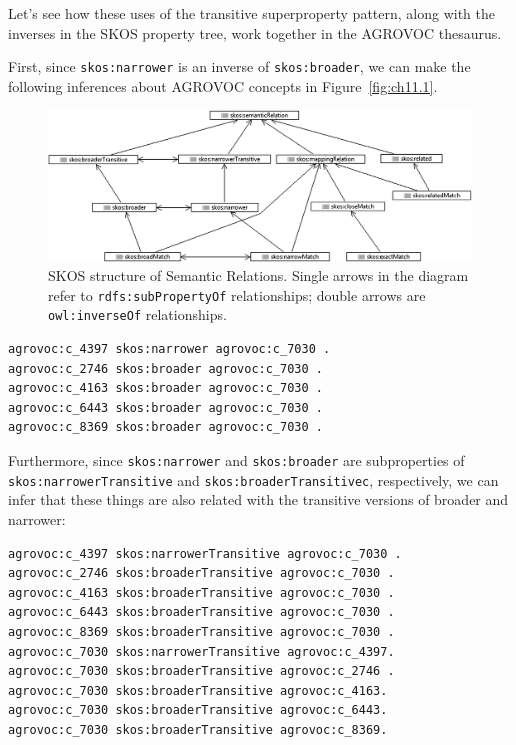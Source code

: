 Let's see how these uses of the transitive superproperty pattern, along
with the inverses in the
SKOS property tree, work together in the AGROVOC thesaurus.

First, since \texttt{skos:narrower} is an inverse of \texttt{skos:broader}, we can make
the following inferences about AGROVOC concepts in Figure~\ref{fig:ch11.1}.

\begin{figure}
\centering
\includegraphics[width=5in]{media/ch11/f11-02.png}
\caption{SKOS structure of Semantic Relations. Single arrows in the diagram refer to \texttt{rdfs:subPropertyOf} relationships; double arrows are \texttt{owl:inverseOf} relationships.}
\label{fig:ch11.2}
\end{figure}





\begin{lstlisting}
agrovoc:c_4397 skos:narrower agrovoc:c_7030 .
agrovoc:c_2746 skos:broader agrovoc:c_7030 .
agrovoc:c_4163 skos:broader agrovoc:c_7030 .
agrovoc:c_6443 skos:broader agrovoc:c_7030 .
agrovoc:c_8369 skos:broader agrovoc:c_7030 .
\end{lstlisting}

Furthermore, since \texttt{skos:narrower} and \texttt{skos:broader} are subproperties of
\texttt{skos:narrowerTransitive} and \texttt{skos:broaderTransitivec}, respectively, we
can infer that these things are also related with the transitive
versions of broader and narrower:

\begin{lstlisting}
agrovoc:c_4397 skos:narrowerTransitive agrovoc:c_7030 .
agrovoc:c_2746 skos:broaderTransitive agrovoc:c_7030 .
agrovoc:c_4163 skos:broaderTransitive agrovoc:c_7030 .
agrovoc:c_6443 skos:broaderTransitive agrovoc:c_7030 .
agrovoc:c_8369 skos:broaderTransitive agrovoc:c_7030 .
agrovoc:c_7030 skos:narrowerTransitive agrovoc:c_4397.
agrovoc:c_7030 skos:broaderTransitive agrovoc:c_2746 .
agrovoc:c_7030 skos:broaderTransitive agrovoc:c_4163.
agrovoc:c_7030 skos:broaderTransitive agrovoc:c_6443.
agrovoc:c_7030 skos:broaderTransitive agrovoc:c_8369.
\end{lstlisting}

